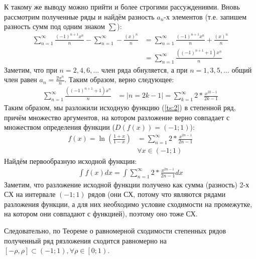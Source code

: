\documentclass[12pt, a4paper]{article}
\begin{document}
К такому же выводу можно прийти и более строгими рассуждениями. Вновь рассмотрим полученные ряды и найдём разность $a_n$-х элементов (т.е. запишем разность сумм под одним знаком $\sum$):
\begin{equation*}
\begin{aligned}
\sum_{n=1}^{\infty}\frac{(-1)^{n+1}x^n}{n} - \sum_{n=1}^{\infty}-\frac{(x)^n}{n} &= \sum_{n=1}^{\infty} \frac{(-1)^{n+1}x^n}{n} + \frac{(x)^n}{n}\\
&= \sum_{n=1}^{\infty} \frac{((-1)^{n+1}+1) x^n}{n}
\end{aligned}
\end{equation*}
Заметим, что при $n=2, 4, 6, \ldots$ член ряда обнуляется, а при $n=1, 3, 5, \ldots$ общий член равен $a_n = \frac{2x^n}{n}$. Таким образом, верно следующее:
\begin{equation*}
\begin{aligned}
\sum_{n=1}^{\infty} \frac{((-1)^{n+1}+1) x^n}{n} &= \left|n=2k-1\right| = \sum_{k=1}^{\infty} 2*\frac{x^{2k-1}}{2k-1}
\end{aligned}
\end{equation*}
Таким образом, мы разложили исходную функцию (\ref{ts:2}) в степенной ряд, причём множество аргументов, на котором разложение верно совпадает с множеством определения функции ($D(f(x))=\left(-1; 1\right)$):
\begin{equation*}
\begin{aligned}
f(x)=\ln\left(\frac{1+x}{1-x}\right) &= \sum_{n=1}^{\infty} 2*\frac{x^{2n-1}}{2n-1}\\
&\forall x \in \left(-1; 1\right)
\end{aligned}
\end{equation*}
Найдём первообразную исходной функции:
\begin{equation*}
\begin{aligned}
\int f(x) dx = \int\sum_{n=1}^{\infty} 2*\frac{x^{2n-1}}{2n-1} dx
\end{aligned}
\end{equation*}
Заметим, что разложение исходной функции получено как сумма (разность) 2-х СХ на интервале $\left(-1; 1\right)$ рядов (они СХ, потому что являются рядами разложения функции, а для них необходимо условие сходимости на промежутке, на котором они совпадают с функцией), поэтому оно тоже СХ.

Следовательно, по Теореме о равномерной сходимости степенных рядов полученный ряд рязложения сходится равномерно на $\left[-\rho, \rho\right] \subset \left(-1; 1\right), \forall \rho \in \left[0; 1\right)$.
\end{document}
